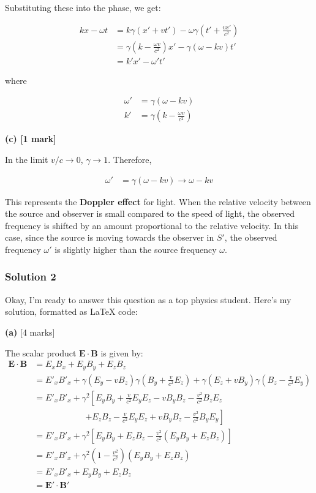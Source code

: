 \documentclass{article}
\begin{document}
Substituting these into the phase, we get:

\begin{align*}
kx - \omega t &= k \gamma (x' + vt') - \omega \gamma \left( t' + \frac{v x'}{c^2} \right) \\
&= \gamma \left( k - \frac{\omega v}{c^2} \right) x' - \gamma (\omega - kv) t' \\
&= k' x' - \omega' t'
\end{align*}

where

\begin{align*}
\omega' &= \gamma (\omega - k v) \\
k' &= \gamma \left( k - \frac{\omega v}{c^2} \right)
\end{align*}

\textbf{(c) [1 mark]}

In the limit $v/c \to 0$, $\gamma \to 1$.  Therefore,

\begin{align*}
\omega' &= \gamma (\omega - kv) \to \omega - kv
\end{align*}

This represents the \textbf{Doppler effect} for light. When the relative velocity between the source and observer is small compared to the speed of light, the observed frequency is shifted by an amount proportional to the relative velocity. In this case, since the source is moving towards the observer in $S'$, the observed frequency $\omega'$ is slightly higher than the source frequency $\omega$.


\subsubsection{Solution 2}
Okay, I'm ready to answer this question as a top physics student. Here's my solution, formatted as LaTeX code:

\textbf{(a)} [4 marks]

The scalar product $\mathbf{E} \cdot \mathbf{B}$ is given by:
\begin{align*}
\mathbf{E} \cdot \mathbf{B} &= E_x B_x + E_y B_y + E_z B_z \\
&= E'_x B'_x + \gamma (E_y - v B_z) \gamma \left( B_y + \frac{v}{c^2} E_z \right) + \gamma (E_z + v B_y) \gamma \left( B_z - \frac{v}{c^2} E_y \right) \\
&= E'_x B'_x + \gamma^2 \left[ E_y B_y + \frac{v}{c^2} E_y E_z - v B_y B_z - \frac{v^2}{c^2} B_z E_z  \right. \\
&\qquad \qquad \qquad \left. + E_z B_z - \frac{v}{c^2} E_y E_z + v B_y B_z - \frac{v^2}{c^2} B_y E_y \right] \\
&= E'_x B'_x + \gamma^2 \left[ E_y B_y + E_z B_z - \frac{v^2}{c^2} (E_y B_y + E_z B_z) \right] \\
&= E'_x B'_x + \gamma^2 \left( 1 - \frac{v^2}{c^2} \right) (E_y B_y + E_z B_z) \\
&= E'_x B'_x + E_y B_y + E_z B_z \\
&= \mathbf{E'} \cdot \mathbf{B'}
\end{align*}
\end{document}
